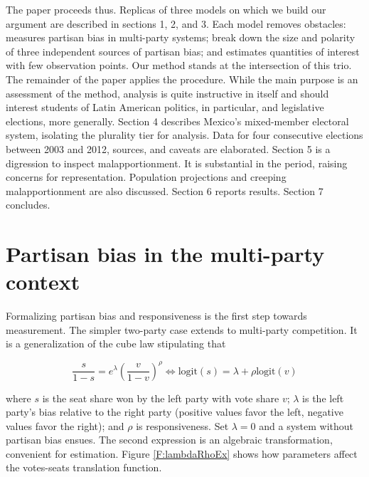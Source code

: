 \documentclass[letter,12pt]{article}
\begin{document}
The paper proceeds thus. Replicas of three models on which we build our argument are described in sections 1, 2, and 3. Each model removes obstacles: \citet{king.1990elRespBiasMultiparty} measures partisan bias in multi-party systems; \citet{grofman.etalBiasMalapp.1997} break down the size and polarity of three independent sources of partisan bias; and \citet{linzerSeatVoteElasticity2012} estimates quantities of interest with few observation points. Our method stands at the intersection of this trio. The remainder of the paper applies the procedure. While the main purpose is an assessment of the method, analysis is quite instructive in itself and should interest students of Latin American politics, in particular, and legislative elections, more generally. Section 4 describes Mexico's mixed-member electoral system, isolating the plurality tier for analysis. Data for four consecutive elections between 2003 and 2012, sources, and caveats are elaborated. Section 5 is a digression to inspect malapportionment. It is substantial in the period, raising concerns for representation. Population projections and creeping malapportionment are also discussed. Section 6 reports results. Section 7 concludes. 






\section{Partisan bias in the multi-party context}

Formalizing partisan bias and responsiveness is the first step towards measurement. The simpler two-party case \citep{taagepera.CubeLaw.1973,tufte1973seatsVotes,king.browning1987biasRespUS} extends to multi-party competition. It is a generalization of the cube law stipulating that 

\begin{equation}\label{E:kingBi}
 \frac{s}{1-s} = e^\lambda  \left(\frac{v}{1-v}\right)^\rho \iff
 \text{logit}(s) = \lambda + \rho  \text{logit}(v)
\end{equation}\label{E:cubeLaw}

\noindent where $s$ is the seat share won by the left party with vote share $v$; $\lambda$ is the left party's bias relative to the right party (positive values favor the left, negative values favor the right); and $\rho$ is responsiveness. Set $\lambda=0$ and a system without partisan bias ensues. The second expression is an algebraic transformation,  convenient for estimation. Figure \ref{F:lambdaRhoEx} shows how parameters affect the votes-seats translation function. 
\end{document}
